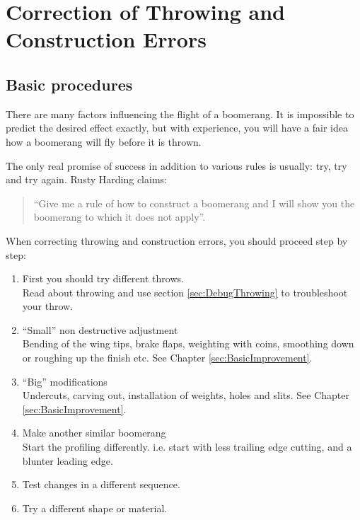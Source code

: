 \chapter[Correcting Errors]{Correction of Throwing and Construction Errors}
\label{sec:correct}
\newpage

\section{Basic procedures}
There are many factors influencing the flight of a boomerang. It is impossible to predict the desired effect exactly, but with experience, you will have a fair idea how a boomerang will fly before it is thrown.

The only real promise of success in addition to various rules is usually: try, try and try again.
Rusty Harding claims: 
\begin{quote}
``Give me a rule of how to construct a boomerang and I will show you the boomerang to which it does not apply''.
\end{quote}

\begin{center}
\colorbox{BOrange!30}{\parbox{30em}{
\colorbox{BOrange!30}{\parbox{28em}{
	\color{black}
	\vspace{1em}
	When correcting throwing and construction errors, you should proceed step by step:
\begin{enumerate}
\item First you should try different throws.\\
Read about throwing and use section \ref{sec:DebugThrowing} to troubleshoot your throw.
\item ``Small'' non destructive adjustment\\
Bending of the wing tips, brake flaps, weighting with coins, smoothing down or roughing up the finish etc.
See Chapter \ref{sec:BasicImprovement}.
\item ``Big'' modifications\\
Undercuts, carving out, installation of weights, holes and slits.
See Chapter \ref{sec:BasicImprovement}.
\item Make another similar boomerang\\
Start the profiling differently. i.e. start with less trailing edge cutting, and a blunter leading edge.
\item Test changes in a different sequence.
\item  Try a different shape or material. 
\end{enumerate}
}}}}
\end{center}

